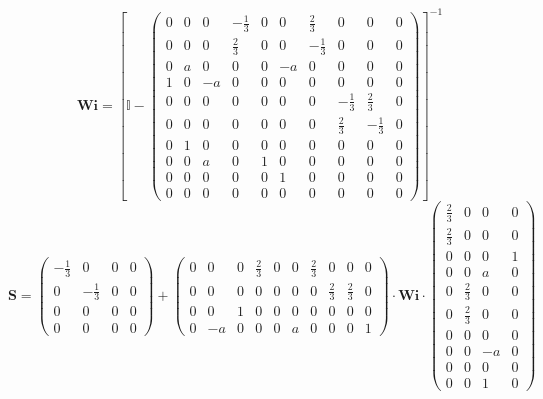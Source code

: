 \[ \mathbf{Wi} =  \left[ \mathbb{I}  - \left(\begin{smallmatrix} 0 & 0 & 0 & -\frac{1}{3} & 0 & 0 & \frac{2}{3} & 0 & 0 & 0 \\ 0 & 0 & 0 & \frac{2}{3} & 0 & 0 & -\frac{1}{3} & 0 & 0 & 0 \\ 0 & a & 0 & 0 & 0 & -a & 0 & 0 & 0 & 0 \\ 1 & 0 & -a & 0 & 0 & 0 & 0 & 0 & 0 & 0 \\ 0 & 0 & 0 & 0 & 0 & 0 & 0 & -\frac{1}{3} & \frac{2}{3} & 0 \\ 0 & 0 & 0 & 0 & 0 & 0 & 0 & \frac{2}{3} & -\frac{1}{3} & 0 \\ 0 & 1 & 0 & 0 & 0 & 0 & 0 & 0 & 0 & 0 \\ 0 & 0 & a & 0 & 1 & 0 & 0 & 0 & 0 & 0 \\ 0 & 0 & 0 & 0 & 0 & 1 & 0 & 0 & 0 & 0 \\ 0 & 0 & 0 & 0 & 0 & 0 & 0 & 0 & 0 & 0 \end{smallmatrix}\right) \right]^{-1}  \]
\[ \mathbf{S} = \left(\begin{smallmatrix} -\frac{1}{3} & 0 & 0 & 0 \\ 0 & -\frac{1}{3} & 0 & 0 \\ 0 & 0 & 0 & 0 \\ 0 & 0 & 0 & 0 \end{smallmatrix}\right) + \left(\begin{smallmatrix} 0 & 0 & 0 & \frac{2}{3} & 0 & 0 & \frac{2}{3} & 0 & 0 & 0 \\ 0 & 0 & 0 & 0 & 0 & 0 & 0 & \frac{2}{3} & \frac{2}{3} & 0 \\ 0 & 0 & 1 & 0 & 0 & 0 & 0 & 0 & 0 & 0 \\ 0 & -a & 0 & 0 & 0 & a & 0 & 0 & 0 & 1 \end{smallmatrix}\right) \cdot \mathbf{Wi} \cdot\left(\begin{smallmatrix} \frac{2}{3} & 0 & 0 & 0 \\ \frac{2}{3} & 0 & 0 & 0 \\ 0 & 0 & 0 & 1 \\ 0 & 0 & a & 0 \\ 0 & \frac{2}{3} & 0 & 0 \\ 0 & \frac{2}{3} & 0 & 0 \\ 0 & 0 & 0 & 0 \\ 0 & 0 & -a & 0 \\ 0 & 0 & 0 & 0 \\ 0 & 0 & 1 & 0 \end{smallmatrix}\right) \]
